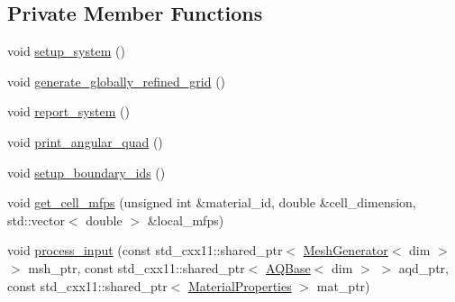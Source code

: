 \subsection*{Private Member Functions}
\begin{DoxyCompactItemize}
\item 
void \hyperlink{class_equation_base_af47f226b1564534307552d7d4e72a54d}{setup\+\_\+system} ()
\item 
void \hyperlink{class_equation_base_a4e6885c2724687cf6bd840694bbbc85e}{generate\+\_\+globally\+\_\+refined\+\_\+grid} ()
\item 
void \hyperlink{class_equation_base_a9b4d33dbf86898d75754a22fda9c9e98}{report\+\_\+system} ()
\item 
void \hyperlink{class_equation_base_acf618369789a383d0aeebd70ddd60b9e}{print\+\_\+angular\+\_\+quad} ()
\item 
void \hyperlink{class_equation_base_aeeac77cdccc1907fe6e53b27e614ee86}{setup\+\_\+boundary\+\_\+ids} ()
\item 
void \hyperlink{class_equation_base_a16045453c59c84bb3f012aef293415aa}{get\+\_\+cell\+\_\+mfps} (unsigned int \&material\+\_\+id, double \&cell\+\_\+dimension, std\+::vector$<$ double $>$ \&local\+\_\+mfps)
\item 
void \hyperlink{class_equation_base_afd853e7e9fd859216a705a517235c6ba}{process\+\_\+input} (const std\+\_\+cxx11\+::shared\+\_\+ptr$<$ \hyperlink{class_mesh_generator}{Mesh\+Generator}$<$ dim $>$ $>$ msh\+\_\+ptr, const std\+\_\+cxx11\+::shared\+\_\+ptr$<$ \hyperlink{class_a_q_base}{A\+Q\+Base}$<$ dim $>$ $>$ aqd\+\_\+ptr, const std\+\_\+cxx11\+::shared\+\_\+ptr$<$ \hyperlink{class_material_properties}{Material\+Properties} $>$ mat\+\_\+ptr)
\end{DoxyCompactItemize}
